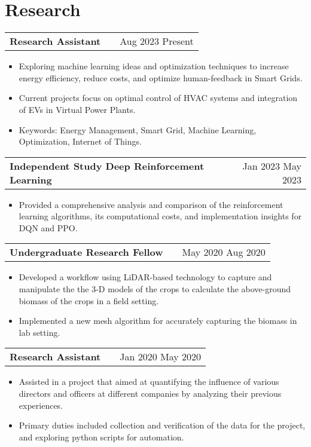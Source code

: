 \documentclass[a4paper,12pt]{article}
\makeatletter
\newenvironment{joblong}[2]
    {
    \begin{tabularx}{\linewidth}{@{}l X r@{}}
    \textbf{#1} & \hfill &  #2 \\[3.75pt]
    \end{tabularx}
    \begin{minipage}[t]{\linewidth}
    \begin{itemize}[nosep,after=\strut, leftmargin=1em, itemsep=3pt,label=--]
    }
    {
    \end{itemize}
    \end{minipage}    
    }
\makeatother
\begin{document}
\section{Research}

\begin{joblong}{Research Assistant}{Aug 2023 Present} %
\item Exploring machine learning ideas and optimization techniques to increase energy efficiency, reduce costs, and optimize human-feedback in Smart Grids. %
\item Current projects focus on optimal control of HVAC systems and integration of EVs in Virtual Power Plants. %
\item Keywords: Energy Management, Smart Grid, Machine Learning, Optimization, Internet of Things. %
\end{joblong}

\begin{joblong}{Independent Study Deep Reinforcement Learning}{Jan 2023 May 2023} %
\item Provided a comprehensive analysis and comparison of the reinforcement learning algorithms, its computational costs, and implementation insights for DQN and PPO. %
\end{joblong}

\begin{joblong}{Undergraduate Research Fellow}{May 2020 Aug 2020} %
\item Developed a workflow using LiDAR-based technology to capture and manipulate the the 3-D models of the crops to calculate the above-ground biomass of the crops in a field setting. %
\item Implemented a new mesh algorithm for accurately capturing the biomass in lab setting. %
\end{joblong}
  
\begin{joblong}{Research Assistant}{Jan 2020 May 2020} %
\item Assisted in a project that aimed at quantifying the influence of various directors and officers at different companies by analyzing their previous experiences. %
\item Primary duties included collection and verification of the data for the project, and exploring python scripts for automation. %
\end{joblong}
\end{document}
